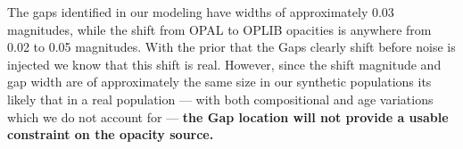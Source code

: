 The gaps identified in our modeling have widths of approximately 0.03
magnitudes, while the shift from OPAL to OPLIB opacities is anywhere from 0.02
to 0.05 magnitudes. With the prior that the Gaps clearly shift before noise is
injected we know that this shift is real. However, since the shift magnitude
and gap width are of approximately the same size in our synthetic populations
its likely that in a real population --- with both compositional and age
variations which we do not account for --- \textbf{the Gap location will not
provide a usable constraint on the opacity source.}
